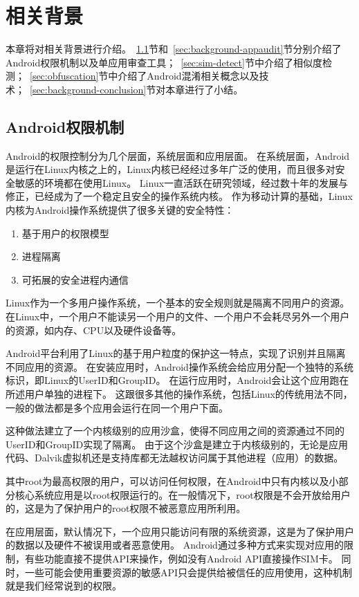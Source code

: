 \chapter{相关背景}
\label{chap:background}
本章将对相关背景进行介绍。~\ref{sec:android-perm}节和~\ref{sec:background-appaudit}节分别介绍了Android权限机制以及单应用审查工具；~\ref{sec:sim-detect}节中介绍了相似度检测；~\ref{sec:obfuscation}节中介绍了Android混淆相关概念以及技术；~\ref{sec:background-conclusion}节对本章进行了小结。

\section{Android权限机制}
\label{sec:android-perm}

Android的权限控制分为几个层面，系统层面和应用层面。
在系统层面，Android是运行在Linux内核之上的，Linux内核已经经过多年广泛的使用，而且很多对安全敏感的环境都在使用Linux。
Linux一直活跃在研究领域，经过数十年的发展与修正，已经成为了一个稳定且安全的操作系统内核。
作为移动计算的基础，Linux内核为Android操作系统提供了很多关键的安全特性：

\begin{enumerate}
  \item 基于用户的权限模型
  \item 进程隔离
  \item 可拓展的安全进程内通信
\end{enumerate}

Linux作为一个多用户操作系统，一个基本的安全规则就是隔离不同用户的资源。
在Linux中，一个用户不能读另一个用户的文件、一个用户不会耗尽另外一个用户的资源，如内存、CPU以及硬件设备等。

Android平台利用了Linux的基于用户粒度的保护这一特点，实现了识别并且隔离不同应用的资源。
在安装应用时，Android操作系统会给应用分配一个独特的系统标识，即Linux的UserID和GroupID。
在运行应用时，Android会让这个应用跑在所述用户单独的进程下。
这跟很多其他的操作系统，包括Linux的传统用法不同，一般的做法都是多个应用会运行在同一个用户下面。

这种做法建立了一个内核级别的应用沙盒，使得不同应用之间的资源通过不同的UserID和GroupID实现了隔离。
由于这个沙盒是建立于内核级别的，无论是应用代码、Dalvik虚拟机还是支持库都无法越权访问属于其他进程（应用）的数据。

其中root为最高权限的用户，可以访问任何权限，在Android中只有内核以及小部分核心系统应用是以root权限运行的。在一般情况下，root权限是不会开放给用户的，这是为了保护用户的root权限不被恶意应用所利用。

在应用层面，默认情况下，一个应用只能访问有限的系统资源，这是为了保护用户的数据以及硬件不被误用或者恶意使用。
Android通过多种方式来实现对应用的限制，有些功能直接不提供API来操作，例如没有Android API直接操作SIM卡。
同时，一些可能会使用重要资源的敏感API只会提供给被信任的应用使用，这种机制就是我们经常说到的权限。

